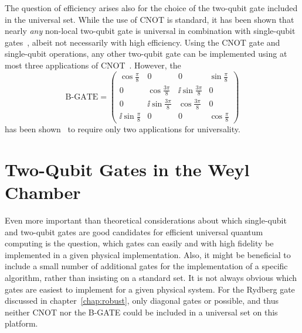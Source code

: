 The question of efficiency arises also for the choice of the two-qubit gate
included in the universal set. While the use of CNOT is standard, it has been
shown that nearly \emph{any} non-local two-qubit gate is universal in
combination with single-qubit gates~\cite{DeutschPRSA1995, ZhangPRL2003}, albeit
not necessarily with high efficiency. Using the CNOT gate and single-qubit
operations, any other two-qubit gate can be implemented using at most three
applications of CNOT~\cite{VidalPRA2004}. However, the
\begin{equation}
\text{B-GATE} =
  \begin{pmatrix}
  \cos\frac{\pi}{8} & 0 & 0  & \sin\frac{\pi}{8} \\
  0 & \cos\frac{3\pi}{8} & \ii \sin\frac{3\pi}{8} & 0 \\
  0 & \ii \sin\frac{3\pi}{8} & \cos\frac{3\pi}{8} & 0 \\
  \ii \sin\frac{\pi}{8} & 0 & 0 & \cos\frac{\pi}{8}
  \end{pmatrix}
\end{equation}
%
has been shown~\cite{ZhangPRL2004} to require only two applications for
universality.

\section{Two-Qubit Gates in the Weyl Chamber}
\label{sec:C_LI}

Even more important than theoretical considerations about which single-qubit
and two-qubit gates are good candidates for efficient universal quantum
computing is the question, which gates can easily and with high fidelity be
implemented in a given physical implementation. Also, it might be beneficial to
include a small number of additional gates for the implementation of a specific
algorithm, rather than insisting on a standard set.
It is not always obvious which gates are easiest to implement for a given
physical system. For the Rydberg gate discussed in chapter~\ref{chap:robust},
only diagonal gates or possible, and thus neither CNOT nor the B-GATE could be
included in a universal set on this platform.

